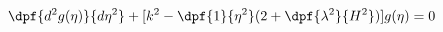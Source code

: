 \begin{equation} %
\dpf{d^2 g(\eta)}{d\eta^2}+[k^2-\dpf{1}{\eta^2}(2+\dpf{\lambda^2}{H^2})]g(\eta)=0
\end{equation}

